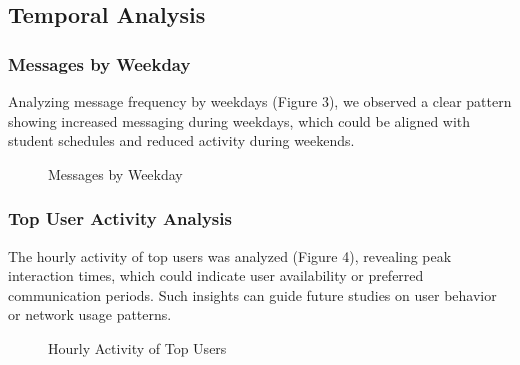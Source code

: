 \subsection{Temporal Analysis}

\subsubsection{Messages by Weekday}
Analyzing message frequency by weekdays (Figure 3), we observed a clear pattern showing increased messaging during weekdays, which could be aligned with student schedules and reduced activity during weekends.

\begin{figure}[h]
\centering
\caption{Messages by Weekday}
\label{fig:messages_weekday}
\end{figure}

\subsubsection{Top User Activity Analysis}
The hourly activity of top users was analyzed (Figure 4), revealing peak interaction times, which could indicate user availability or preferred communication periods. Such insights can guide future studies on user behavior or network usage patterns.

\begin{figure}[h]
\centering
\caption{Hourly Activity of Top Users}
\label{fig:hourly_activity}
\end{figure}

